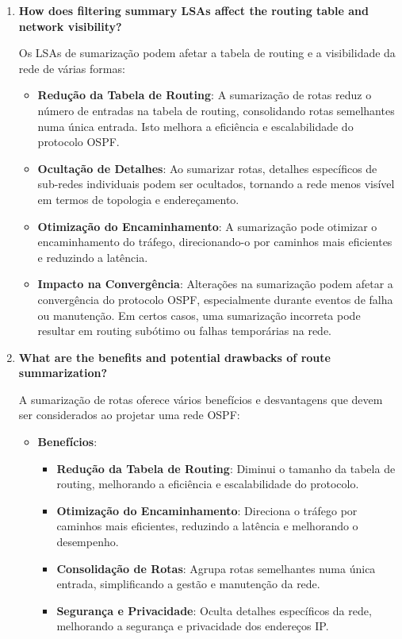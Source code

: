 \documentclass[11pt,english, openright, oneside]{book}
\begin{document}
\begin{enumerate}
  \item \textbf{How does filtering summary LSAs affect the routing table and network visibility?}
  \vspace{0.2cm}

  Os LSAs de sumarização podem afetar a tabela de routing e a visibilidade da rede de várias formas:
  \vspace{0.2cm}

  \begin{itemize}
    \item \textbf{Redução da Tabela de Routing}: A sumarização de rotas reduz o número de entradas na tabela de routing, consolidando rotas semelhantes numa única entrada. Isto melhora a eficiência e escalabilidade do protocolo OSPF.
    \item \textbf{Ocultação de Detalhes}: Ao sumarizar rotas, detalhes específicos de sub-redes individuais podem ser ocultados, tornando a rede menos visível em termos de topologia e endereçamento.
    \item \textbf{Otimização do Encaminhamento}: A sumarização pode otimizar o encaminhamento do tráfego, direcionando-o por caminhos mais eficientes e reduzindo a latência.
    \item \textbf{Impacto na Convergência}: Alterações na sumarização podem afetar a convergência do protocolo OSPF, especialmente durante eventos de falha ou manutenção. Em certos casos, uma sumarização incorreta pode resultar em routing subótimo ou falhas temporárias na rede.
  \end{itemize}
  \vspace{0.2cm}

  \item \textbf{What are the benefits and potential drawbacks of route summarization?}
  \vspace{0.2cm}

  A sumarização de rotas oferece vários benefícios e desvantagens que devem ser considerados ao projetar uma rede OSPF:
  \vspace{0.2cm}

  \begin{itemize}
    \item \textbf{Benefícios}:
    \begin{itemize}
      \item \textbf{Redução da Tabela de Routing}: Diminui o tamanho da tabela de routing, melhorando a eficiência e escalabilidade do protocolo.
      \item \textbf{Otimização do Encaminhamento}: Direciona o tráfego por caminhos mais eficientes, reduzindo a latência e melhorando o desempenho.
      \item \textbf{Consolidação de Rotas}: Agrupa rotas semelhantes numa única entrada, simplificando a gestão e manutenção da rede.
      \item \textbf{Segurança e Privacidade}: Oculta detalhes específicos da rede, melhorando a segurança e privacidade dos endereços IP.
    \end{itemize}


\end{itemize}
\end{enumerate}
\end{document}
